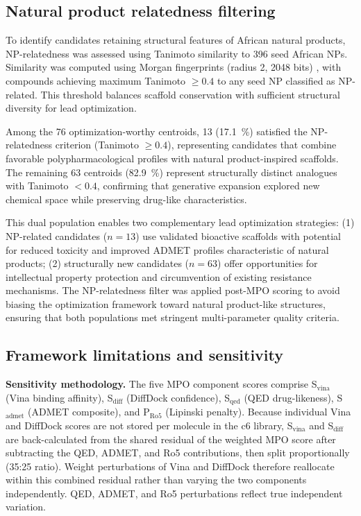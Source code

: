 \documentclass[journal=jcisd8,manuscript=suppinfo]{achemso}
\begin{document}
\subsection*{Natural product relatedness filtering}

To identify candidates retaining structural features of African natural products, NP-relatedness was assessed using Tanimoto similarity to \num{396} seed African NPs. Similarity was computed using Morgan fingerprints (radius \num{2}, \num{2048} bits) \cite{Rogers2010}, with compounds achieving maximum Tanimoto $\geq \num{0.4}$ to any seed NP classified as NP-related. This threshold balances scaffold conservation with sufficient structural diversity for lead optimization.

Among the \num{76} optimization-worthy centroids, \num{13} (\qty{17.1}{\percent}) satisfied the NP-relatedness criterion (Tanimoto $\geq \num{0.4}$), representing candidates that combine favorable polypharmacological profiles with natural product-inspired scaffolds. The remaining \num{63} centroids (\qty{82.9}{\percent}) represent structurally distinct analogues with Tanimoto $< \num{0.4}$, confirming that generative expansion explored new chemical space while preserving drug-like characteristics.

This dual population enables two complementary lead optimization strategies: (1) NP-related candidates ($n = \num{13}$) use validated bioactive scaffolds with potential for reduced toxicity and improved ADMET profiles characteristic of natural products; (2) structurally new candidates ($n = \num{63}$) offer opportunities for intellectual property protection and circumvention of existing resistance mechanisms. The NP-relatedness filter was applied post-MPO scoring to avoid biasing the optimization framework toward natural product-like structures, ensuring that both populations met stringent multi-parameter quality criteria.

\subsection*{Framework limitations and sensitivity}

\label{sec:mpo_sensitivity_methods}

\textbf{Sensitivity methodology.} The five MPO component scores comprise S$_{\text{vina}}$ (Vina binding affinity), S$_{\text{diff}}$ (DiffDock confidence), S$_{\text{qed}}$ (QED drug-likeness), S$_{\text{admet}}$ (ADMET composite), and P$_{\text{Ro5}}$ (Lipinski penalty). Because individual Vina and DiffDock scores are not stored per molecule in the c6 library, S$_{\text{vina}}$ and S$_{\text{diff}}$ are back-calculated from the shared residual of the weighted MPO score after subtracting the QED, ADMET, and Ro5 contributions, then split proportionally (35:25 ratio). Weight perturbations of Vina and DiffDock therefore reallocate within this combined residual rather than varying the two components independently. QED, ADMET, and Ro5 perturbations reflect true independent variation.
\end{document}
